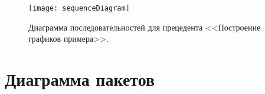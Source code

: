 \documentclass[14pt]{extreport}
\begin{document}
\begin{figure}[H]
\centerline{\texttt{[image: sequenceDiagram]}}
\caption{Диаграмма последовательностей для прецедента <<Построение графиков примера>>.}
\label{fig9}
\end{figure}


\section{Диаграмма пакетов}



\conclusions






\end{document}
